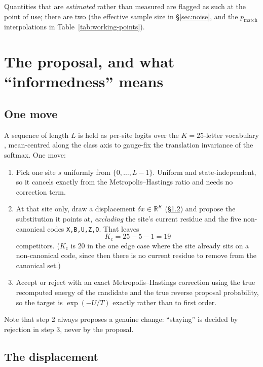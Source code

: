 \documentclass[11pt,a4paper]{article}
\newcommand{\pmatch}{p_{\mathrm{match}}}
\newcommand{\Ncomp}{K_{\mathrm{c}}}
\begin{document}
Quantities that are \emph{estimated} rather than measured are flagged as such
at the point of use; there are two (the effective sample size in
\S\ref{sec:noise}, and the $\pmatch$ interpolations in
Table~\ref{tab:working-points}).

\section{The proposal, and what ``informedness'' means}

\subsection{One move}

A sequence of length $L$ is held as per-site logits over the
$K=25$-letter vocabulary , mean-centred along the
class axis to gauge-fix the translation invariance of the softmax. One move:

\begin{enumerate}
  \item Pick one site $s$ uniformly from $\{0,\dots,L-1\}$. Uniform and
        state-independent, so it cancels exactly from the
        Metropolis--Hastings ratio and needs no correction term.
  \item At that site only, draw a displacement $\delta x\in\mathbb{R}^{K}$
        (\S\ref{sec:displacement}) and propose the substitution it points at,
        \emph{excluding} the site's current residue and the five non-canonical
        codes \texttt{X,B,U,Z,O}. That leaves
        \[
          \Ncomp = 25 - 5 - 1 = 19
        \]
        competitors. ($\Ncomp$ is $20$ in the one edge case where the site
        already sits on a non-canonical code, since then there is no current
        residue to remove from the canonical set.)
  \item Accept or reject with an exact Metropolis--Hastings correction using
        the true recomputed energy of the candidate and the true reverse
        proposal probability, so the target is $\exp(-U/T)$ exactly rather
        than to first order.
\end{enumerate}

Note that step 2 always proposes a genuine change: ``staying'' is decided by
rejection in step 3, never by the proposal.

\subsection{The displacement}
\label{sec:displacement}
\end{document}
